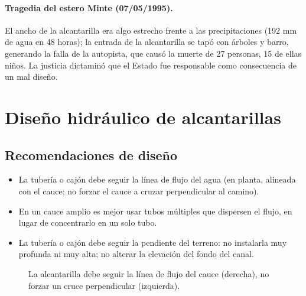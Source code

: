 \paragraph{Tragedia del estero Minte (07/05/1995).} El ancho de la
alcantarilla era algo estrecho frente a las precipitaciones (192 mm de agua
en 48 horas); la entrada de la alcantarilla se tapó con árboles y barro,
generando la falla de la autopista, que causó la muerte de 27 personas, 15
de ellas niños. La justicia dictaminó que el Estado fue responsable como
consecuencia de un mal diseño.

\section{Diseño hidráulico de alcantarillas}
\subsection{Recomendaciones de diseño}
\begin{itemize}
  \item La tubería o cajón debe seguir la línea de flujo del agua (en planta,
        alineada con el cauce; no forzar el cauce a cruzar perpendicular al camino).
  \item En un cauce amplio es mejor usar tubos múltiples que dispersen el
        flujo, en lugar de concentrarlo en un solo tubo.
  \item La tubería o cajón debe seguir la pendiente del terreno: no instalarla
        muy profunda ni muy alta; no alterar la elevación del fondo del canal.
\end{itemize}

\begin{figure}[H]
\centering
{}
\caption{La alcantarilla debe seguir la línea de flujo del cauce (derecha), no
forzar un cruce perpendicular (izquierda).}
\end{figure}

